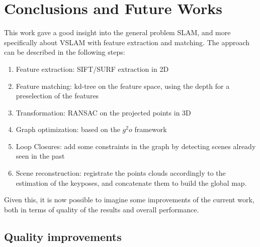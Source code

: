 \chapter{Conclusions and Future Works}
\label{chap:conclusion}

This work gave a good insight into the general problem \gls{SLAM}, and more specifically about \gls{VSLAM} with feature extraction and matching. The approach can be described in the following steps:
\begin{enumerate}
\item Feature extraction: \gls{SIFT}/\gls{SURF} extraction in 2D
\item Feature matching: kd-tree on the feature space, using the depth for a preselection of the features
\item Transformation: \gls{RANSAC} on the projected points in 3D
\item Graph optimization: based on the $g^2o$ framework
\item Loop Closures: add some constraints in the graph by detecting scenes already seen in the past
\item Scene reconstruction: registrate the points clouds accordingly to the estimation of the keyposes, and concatenate them to build the global map.
\end{enumerate}

Given this, it is now possible to imagine some improvements of the current work, both in terms of quality of the results and overall performance.

\section{Quality improvements}

